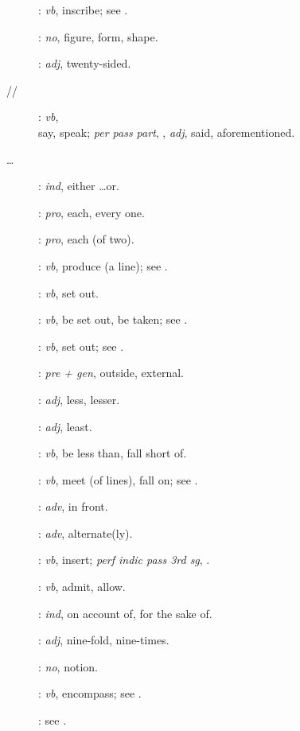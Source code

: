 {\begin{description}
\item[]: {\em vb}, inscribe; see .
\item[]: {\em no}, figure, form, shape.
\item[]: {\em adj}, twenty-sided.
\item[//]: {\em vb},\\  say, speak; {\em per pass part}, , {\em adj}, said, aforementioned.
\item[ \ldots {}]: {\em ind}, either \ldots or.
\item[]: {\em pro}, each, every one.
\item[]: {\em pro}, each (of two).
\item[]: {\em vb},  produce (a line); see . 
\item[]: {\em vb}, set out.
\item[]: {\em vb}, be set out, be taken; see .
\item[]: {\em vb}, set out; see .
\item[]: {\em pre + gen}, outside, external.
\item[]: {\em adj}, less, lesser.
\item[]: {\em adj}, least.
\item[]: {\em vb}, be less than, fall short of.
\item[]: {\em vb}, meet (of lines), fall on; see .
\item[]: {\em adv}, in front.
\item[]: {\em adv}, alternate(ly).
\item[]: {\em vb}, insert; {\em perf indic pass 3rd sg}, .
\item[]: {\em vb}, admit, allow.
\item[]: {\em ind}, on account of, for the sake of.
\item[]: {\em adj}, nine-fold, nine-times.
\item[]: {\em no}, notion.
\item[]: {\em vb}, encompass; see .
\item[]: see .

\end{description}}
